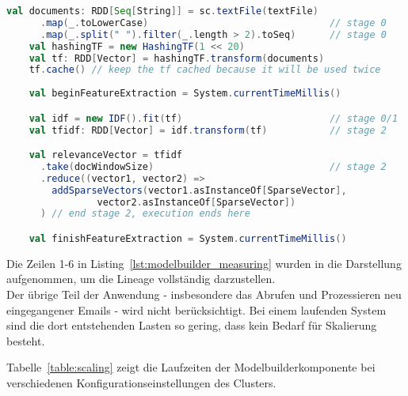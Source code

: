 \begin{lstlisting}[language=Scala,caption={Laufzeitmessung},label={lst:modelbuilder_measuring}]
    val documents: RDD[Seq[String]] = sc.textFile(textFile)
      .map(_.toLowerCase)                                // stage 0
      .map(_.split(" ").filter(_.length > 2).toSeq)      // stage 0
    val hashingTF = new HashingTF(1 << 20)
    val tf: RDD[Vector] = hashingTF.transform(documents)
    tf.cache() // keep the tf cached because it will be used twice
		
    val beginFeatureExtraction = System.currentTimeMillis()

    val idf = new IDF().fit(tf)                          // stage 0/1
    val tfidf: RDD[Vector] = idf.transform(tf)           // stage 2

    val relevanceVector = tfidf
      .take(docWindowSize)                               // stage 2
      .reduce((vector1, vector2) =>
        addSparseVectors(vector1.asInstanceOf[SparseVector], 
				vector2.asInstanceOf[SparseVector])
      ) // end stage 2, execution ends here

    val finishFeatureExtraction = System.currentTimeMillis()
\end{lstlisting}

Die Zeilen 1-6 in Listing~\ref{lst:modelbuilder_measuring} wurden in die Darstellung aufgenommen, um die Lineage vollständig darzustellen.\\

Der übrige Teil der Anwendung - insbesondere das Abrufen und Prozessieren neu eingegangener Emails - wird nicht berücksichtigt. Bei einem laufenden System sind die dort entstehenden Lasten so gering, dass kein Bedarf für Skalierung besteht.

Tabelle~\ref{table:scaling} zeigt die Laufzeiten der Modelbuilderkomponente bei verschiedenen Konfigurationseinstellungen des Clusters.

